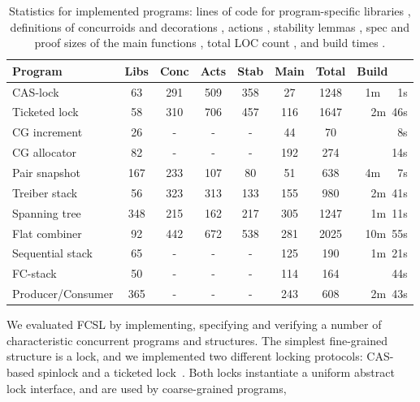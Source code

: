 {
\begin{table}[t]
{%
\centering
\begin{tabular}{|@{\ }l@{\ \ \ }||@{\ }c@{\ }|@{\ }c@{\ }|@{\ }c@{\ }|@{\ }c@{\ }|@{\ }c@{\ }|@{\ }c@{\ }||@{\ }r@{\ }|}
  \hline
  \textbf{Program} &  
  {Libs} & {Conc} & {Acts} &
  {Stab} & {Main} & \textbf{Total}
  & \textbf{Build~~~}   
  \\ \hline \hline 
  CAS-lock & 63 & 291 & 509 & 358 & 27 & 1248 & 1m~~~1s
  \\
  Ticketed lock & 58 & 310 & 706 & 457 & 116 & 1647 & 2m~46s
  \\
  CG increment & 26 & - & - & - & 44 & 70 & 8s
  \\
  CG allocator & 82 & - & - & - & 192 & 274 & 14s
  \\
  Pair snapshot & 167 & 233 & 107 & 80 & 51 & 638 & 4m~~~7s 
  \\
  Treiber stack & 56 & 323 & 313 & 133  & 155 & 980 & 2m~41s
  \\
  Spanning tree & 348 & 215 & 162 & 217 & 305 & 1247 & 1m~11s
  \\
  Flat combiner & 92 & 442 & 672 & 538 & 281 & 2025 &  10m~55s
  \\ 
  Sequential stack & 65 & - & - & - & 125 & 190 & 1m~21s
  \\
  FC-stack & 50 & - & - & - & 114 & 164 & 44s
  \\
  Producer/Consumer & 365 & - & - & - & 243 & 608 & 2m~43s
  \\[2pt] \hline
\end{tabular}
\vspace{15pt}
\caption{ 
  Statistics for implemented programs: lines of code for program-specific libraries ,
  definitions of concurroids and decorations , actions ,
  stability lemmas , spec and proof sizes of the main
  functions , total LOC count , and build
  times .
} 
\label{tab:locs}
}
\end{table}}
%
We evaluated FCSL by implementing, specifying and verifying a number
of characteristic concurrent programs and structures. The simplest
fine-grained structure is a lock, and we implemented two different
locking protocols: CAS-based spinlock and a ticketed
lock~\cite{DinsdaleYoung-al:ECOOP10}. Both locks instantiate a uniform
abstract lock interface, and are used by coarse-grained programs,
